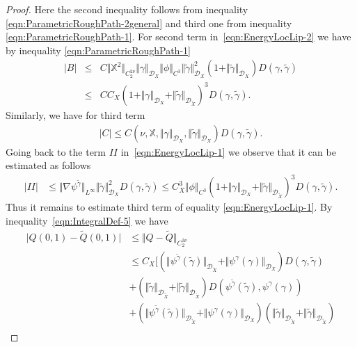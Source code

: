 \documentclass[11pt,a4paper,reqno]{amsart}%
\theoremstyle{plain}
\theoremstyle{remark}
\theoremstyle{plain}
\numberwithin{equation}{section}
\begin{document}
\begin{proof}
Here the second inequality follows from inequality
\eqref{eqn:ParametricRoughPath-2general} and third one from
inequality \eqref{eqn:ParametricRoughPath-1}. For second term in~\eqref{eqn:EnergyLocLip-2} we
have by inequality \eqref{eqn:ParametricRoughPath-1}
\begin{eqnarray}
\vert B\vert &\leq&
C\Vert \mathbb{X}^2\Vert_{C_2^{2\nu}}\Vert \gamma\Vert_{\mathcal{D}_X}\Vert \phi\Vert_{C^3}\Vert \tilde{\gamma}\Vert_{\mathcal{D}_X}^2
(1+\Vert \tilde{\gamma}\Vert_{\mathcal{D}_X})D( \gamma,\tilde{\gamma})\nonumber
\\
&\leq& CC_X(1+\Vert \gamma\Vert_{\mathcal{D}_X}+\Vert \tilde{\gamma}\Vert_{\mathcal{D}_{\tilde{X}}})^3 D( \gamma,\tilde{\gamma}).
\label{eqn:EnergyLocLip-4}
\end{eqnarray}
Similarly, we have for third term
\begin{eqnarray}
\vert C\vert \leq
C(\nu,\mathbb{X},\Vert \gamma\Vert_{\mathcal{D}_X},\Vert \tilde{\gamma}\Vert_{\mathcal{D}_X})D( \gamma,\tilde{\gamma}).\label{eqn:EnergyLocLip-5}
\end{eqnarray}
Going back to the term $II$ in~\eqref{eqn:EnergyLocLip-1} we observe that it can be estimated as
follows
\begin{align*}
\vert II\vert &\leq
\Vert \nabla\psi^{\tilde{\gamma}}\Vert_{L^{\infty}}\Vert \tilde{\gamma}\Vert_{\mathcal{D}_X}^2D( \gamma,\tilde{\gamma})
\leq
C_X^3\Vert \phi\Vert_{C^3}(1+\Vert \gamma\Vert_{\mathcal{D}_X}+\Vert \tilde{\gamma}\Vert_{\mathcal{D}_{\tilde{X}}})^3D( \gamma,\tilde{\gamma}).
\end{align*}
Thus it remains to estimate third term of equality
\eqref{eqn:EnergyLocLip-1}. By inequality~\eqref{eqn:IntegralDef-5} we have
\begin{align*}
\vert Q(0,1)-\tilde{Q}(0,1)\vert &\leq \Vert Q-\tilde{Q}\Vert_{C_2^{3\nu}}\\
&\leq
C_X\Big[(\Vert \psi^{\tilde{\gamma}}(\tilde{\gamma})\Vert_{\mathcal{D}_{\tilde{X}}}+
\Vert \psi^{\gamma}(\gamma)\Vert_{\mathcal{D}_X})D( \gamma,\tilde{\gamma})\\
&+(\Vert \tilde{\gamma}\Vert_{\mathcal{D}_{\tilde{X}}}+\Vert \tilde{\gamma}\Vert_{\mathcal{D}_{\tilde{X}}})D( \psi^{\tilde{\gamma}}(\tilde{\gamma}), \psi^{\gamma}(\gamma))\\
&+(\Vert \psi^{\tilde{\gamma}}(\tilde{\gamma})\Vert_{\mathcal{D}_{\tilde{X}}}+
\Vert \psi^{\gamma}(\gamma)\Vert_{\mathcal{D}_X})(\Vert \tilde{\gamma}\Vert_{\mathcal{D}_{\tilde{X}}}+\Vert \tilde{\gamma}\Vert_{\mathcal{D}_{\tilde{X}}})\\

\end{align*}
\end{proof}
\end{document}
